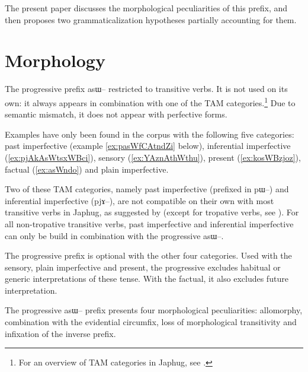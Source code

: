 \documentclass[oldfontcommands,oneside,a4paper,11pt]{article}
\newcommand{\ipa}[1]{{\phon \mbox{#1}}} %
\begin{document}
The present paper discusses the morphological peculiarities of this prefix, and then proposes two grammaticalization hypotheses partially accounting for them.

\section{Morphology}

The progressive prefix \ipa{asɯ--} restricted to transitive verbs. It is not used on its own: it always appears in combination with one of the TAM categories.\footnote{For an overview of TAM categories in Japhug, see \citealt{jacques14linking}.} Due to semantic mismatch, it does not appear with perfective forms.

Examples have only been found in the corpus with the following five categories: past imperfective (example \ref{ex:pasWfCAtndZi} below), inferential imperfective (\ref{ex:pjAkAsWtsxWBci}), sensory (\ref{ex:YAznAthWthu}), present (\ref{ex:kosWBzjoz}), factual (\ref{ex:asWndo}) and plain imperfective. 

Two of these TAM categories, namely past imperfective (prefixed in \ipa{pɯ--}) and inferential imperfective (\ipa{pjɤ--}), are not compatible on their own with most transitive verbs in Japhug, as suggested by \citet{lin11direction} (except for tropative verbs, see \citealt{jacques13tropative}). For all non-tropative transitive verbs, past imperfective and inferential imperfective can only be build in combination with the progressive \ipa{asɯ--}. 

The progressive prefix is optional with the other four categories. Used with the sensory, plain imperfective and present, the progressive excludes habitual or generic interpretations of these tense. With the factual, it also excludes future interpretation.

The progressive \ipa{asɯ--} prefix presents four morphological peculiarities: allomorphy, combination with the evidential circumfix, loss of morphological transitivity and infixation of the inverse prefix.
\end{document}
